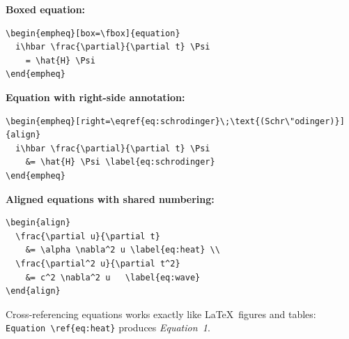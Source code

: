 \textbf{Boxed equation:}

\begin{verbatim}
\begin{empheq}[box=\fbox]{equation}
  i\hbar \frac{\partial}{\partial t} \Psi
    = \hat{H} \Psi
\end{empheq}
\end{verbatim}

\textbf{Equation with right-side annotation:}

\begin{verbatim}
\begin{empheq}[right=\eqref{eq:schrodinger}\;\text{(Schr\"odinger)}]{align}
  i\hbar \frac{\partial}{\partial t} \Psi
    &= \hat{H} \Psi \label{eq:schrodinger}
\end{empheq}
\end{verbatim}

\textbf{Aligned equations with shared numbering:}

\begin{verbatim}
\begin{align}
  \frac{\partial u}{\partial t}
    &= \alpha \nabla^2 u \label{eq:heat} \\
  \frac{\partial^2 u}{\partial t^2}
    &= c^2 \nabla^2 u   \label{eq:wave}
\end{align}
\end{verbatim}

Cross-referencing equations works exactly like \LaTeX\ figures and
tables: \texttt{Equation~\textbackslash ref\{eq:heat\}} produces
\emph{Equation~1}.
